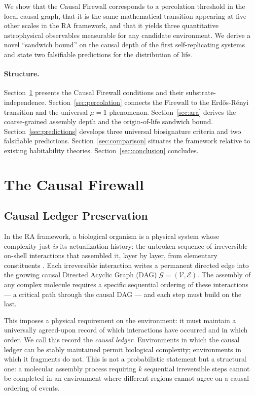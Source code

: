 \documentclass[11pt,a4paper]{article}
\theoremstyle{plain}
\theoremstyle{definition}
\theoremstyle{remark}
\begin{document}
We show that the Causal Firewall corresponds to a percolation threshold in the
local causal graph, that it is the same mathematical transition appearing at
five other scales in the RA framework, and that it yields three quantitative
astrophysical observables measurable for any candidate environment. We derive
a novel ``sandwich bound'' on the causal depth of the first self-replicating
systems and state two falsifiable predictions for the distribution of life.

\paragraph{Structure.}
Section~\ref{sec:firewall} presents the Causal Firewall conditions and their
substrate-independence. Section~\ref{sec:percolation} connects the Firewall
to the Erd\H{o}s-R\'{e}nyi transition and the universal $\mu = 1$ phenomenon.
Section~\ref{sec:ara} derives the coarse-grained assembly depth and the
origin-of-life sandwich bound. Section~\ref{sec:predictions} develops three
universal biosignature criteria and two falsifiable predictions.
Section~\ref{sec:comparison} situates the framework relative to existing
habitability theories. Section~\ref{sec:conclusion} concludes.

\section{The Causal Firewall}
\label{sec:firewall}

\subsection{Causal Ledger Preservation}

In the RA framework, a biological organism is a physical system whose
complexity just \emph{is} its actualization history: the unbroken sequence
of irreversible on-shell interactions that assembled it, layer by layer,
from elementary constituents \citep{Sandeman2026RAHC}. Each irreversible
interaction writes a permanent directed edge into the growing causal Directed
Acyclic Graph (DAG) $\mathcal{G} = (\mathcal{V}, \mathcal{E})$. The assembly
of any complex molecule requires a specific sequential ordering of these
interactions --- a critical path through the causal DAG --- and each step
must build on the last.

This imposes a physical requirement on the environment: it must maintain a
universally agreed-upon record of which interactions have occurred and in
which order. We call this record the \emph{causal ledger}. Environments in
which the causal ledger can be stably maintained permit biological complexity;
environments in which it fragments do not. This is not a probabilistic
statement but a structural one: a molecular assembly process requiring $k$
sequential irreversible steps cannot be completed in an environment where
different regions cannot agree on a causal ordering of events.
\end{document}
